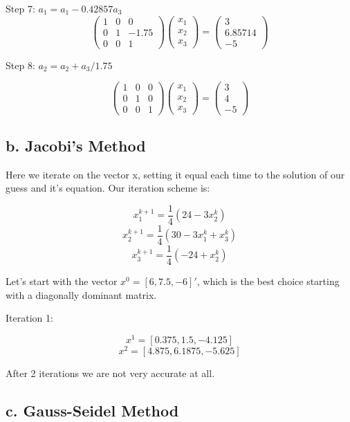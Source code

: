 \documentclass[]{article}
\begin{document}
Step 7: \(a_1= a_1-0.42857a_3\) \[
\left(\begin{array}{ccc} 
1 & 0 & 0\\
0 & 1 & -1.75\\
0 & 0 & 1
\end{array}\right)
\left(\begin{array}{c} 
x_1 \\
x_2 \\
x_3
\end{array}\right) =
\left(\begin{array}{c}
3 \\
6.85714 \\
-5
\end{array}\right)
\]

Step 8: \(a_2 = a_2 + a_3/1.75\)

\[
\left(\begin{array}{ccc} 
1 & 0 & 0\\
0 & 1 & 0\\
0 & 0 & 1
\end{array}\right)
\left(\begin{array}{c} 
x_1 \\
x_2 \\
x_3
\end{array}\right) =
\left(\begin{array}{c}
3 \\
4 \\
-5
\end{array}\right)
\]

\hypertarget{b.-jacobis-method}{%
\subsection{b. Jacobi's Method}\label{b.-jacobis-method}}

Here we iterate on the vector x, setting it equal each time to the
solution of our guess and it's equation. Our iteration scheme is:

\[x_1^{k+1} = \frac1{4}(24-3x_2^k)\]
\[x_2^{k+1}= \frac1{4}(30-3x_1^k+x_3^k)\]
\[x_3^{k+1}=\frac1{4}(-24+x_2^k)\]

Let's start with the vector \(x^0=[6, 7.5, -6]'\), which is the best
choice starting with a diagonally dominant matrix.

Iteration 1:

\[x^1=[0.375, 1.5, -4.125]\] \[x^2=[4.875, 6.1875, -5.625]\]

After 2 iterations we are not very accurate at all.

\hypertarget{c.-gauss-seidel-method}{%
\subsection{c. Gauss-Seidel Method}\label{c.-gauss-seidel-method}}
\end{document}
